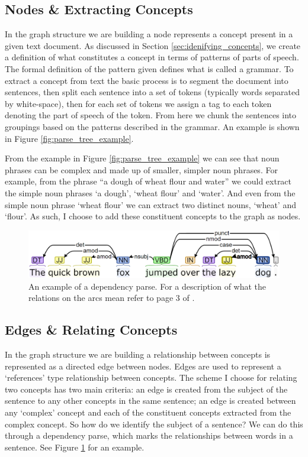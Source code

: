 \documentclass[12pt]{article}
\begin{document}
\subsection{Nodes \& Extracting Concepts}
In the graph structure we are building a node represents a concept present in a given text document. As discussed in Section \ref{sec:idenifying_concepts}, we create a definition of what constitutes a concept in terms of patterns of parts of speech. The formal definition of the pattern given defines what is called a grammar. To extract a concept from text the basic process is to segment the document into sentences, then split each sentence into a set of tokens (typically words separated by white-space), then for each set of tokens we assign a tag to each token denoting the part of speech of the token. From here we chunk the sentences into groupings based on the patterns described in the grammar. An example is shown in Figure \ref{fig:parse_tree_example}.

From the example in Figure \ref{fig:parse_tree_example} we can see that noun phrases can be complex and made up of smaller, simpler noun phrases. For example, from the phrase ``a dough of wheat flour and water'' we could extract the simple noun phrases `a dough', `wheat flour' and `water'. And even from the simple noun phrase `wheat flour' we can extract two distinct nouns, `wheat' and `flour'.  As such, I choose to add these constituent concepts to the graph as nodes.

\begin{figure}
    \centering
    \includegraphics[width=\linewidth]{reports/technical_report/latex/figures/dependency_parse.png}
    \caption{An example of a dependency parse.\protect\footnotemark 
    For a description of what the relations on the arcs mean refer to page 3 of \citep{martin2009speech}.}
    \label{fig:dependency_parse_example}
\end{figure}


\subsection{Edges \& Relating Concepts}
In the graph structure we are building a relationship between concepts is represented as a directed edge between nodes. Edges are used to represent a `references' type relationship between concepts. The scheme I choose for relating two concepts has two main criteria: an edge is created from the subject of the sentence to any other concepts in the same sentence; an edge is created between any `complex' concept and each of the constituent concepts extracted from the complex concept. So how do we identify the subject of a sentence? We can do this through a dependency parse, which marks the relationships between words in a sentence. See Figure \ref{fig:dependency_parse_example} for an example. 
\end{document}
